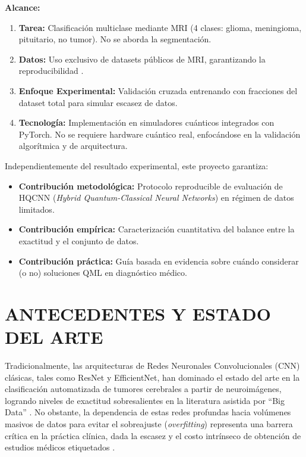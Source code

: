 \documentclass[12pt,letterpaper]{article}
\begin{document}
    \textbf{Alcance:}
    \begin{enumerate}
        \item \textbf{Tarea:} Clasificación multiclase mediante MRI (4 clases: glioma, meningioma, pituitario, no tumor).
        No se aborda la segmentación.
        \item \textbf{Datos:} Uso exclusivo de datasets públicos de MRI, garantizando la reproducibilidad \citep{nickparvar2023dataset}.
        \item \textbf{Enfoque Experimental:} Validación cruzada entrenando con fracciones del dataset total para simular escasez de datos.
        \item \textbf{Tecnología:} Implementación en simuladores cuánticos integrados con PyTorch. No se requiere hardware cuántico real, enfocándose en la validación algorítmica y de arquitectura.
    \end{enumerate}

    Independientemente del resultado experimental, este proyecto garantiza: 
    \begin{itemize}
        \item \textbf{Contribución metodológica:} Protocolo reproducible de evaluación de HQCNN (\textit{Hybrid Quantum-Classical Neural Networks}) en régimen de datos limitados.
        \item \textbf{Contribución empírica:} Caracterización cuantitativa del balance entre la exactitud y el conjunto de datos.
        \item \textbf{Contribución práctica:} Guía basada en evidencia sobre cuándo 
    considerar (o no) soluciones QML en diagnóstico médico.
    \end{itemize}

    \newpage
    \section{ANTECEDENTES Y ESTADO DEL ARTE}
    \vspace{-0.5cm}

    Tradicionalmente, las arquitecturas de Redes Neuronales Convolucionales (CNN) clásicas, tales como ResNet y EfficientNet, han dominado el estado del arte en la clasificación automatizada de tumores cerebrales a partir de neuroimágenes, logrando niveles de exactitud sobresalientes en la literatura asistida por ``Big Data'' \citep{tan2019efficientnet, shahriyar2025advancements}. No obstante, la dependencia de estas redes profundas hacia volúmenes masivos de datos para evitar el sobreajuste (\textit{overfitting}) representa una barrera crítica en la práctica clínica, dada la escasez y el costo intrínseco de obtención de estudios médicos etiquetados \citep{willemink2020preparing}.
    
\end{document}
